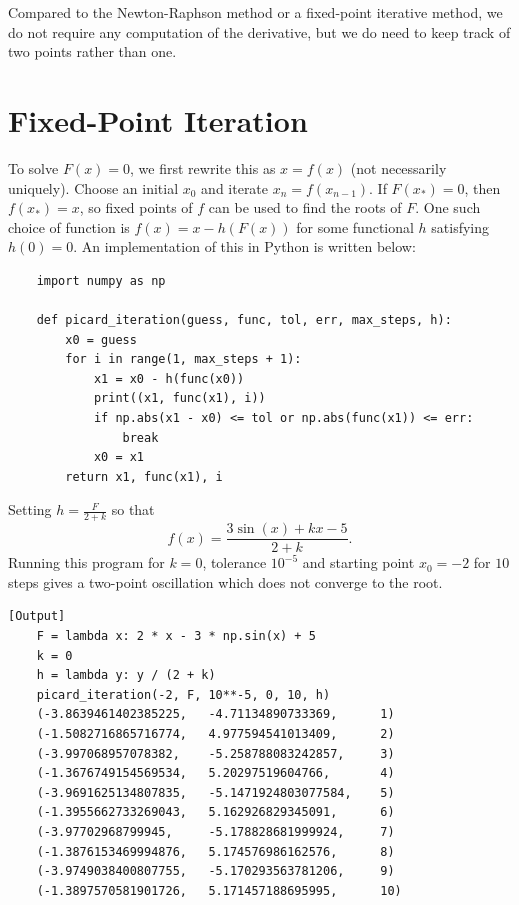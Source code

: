 \documentclass{article}
\begin{document}
Compared to the Newton-Raphson method or a fixed-point iterative method, we do not require any computation of the derivative, but we do need to keep track of two points rather than one.

\section{Fixed-Point Iteration}
To solve \(F(x) = 0\), we first rewrite this as \(x = f(x)\) (not necessarily uniquely). Choose an initial \(x_0\) and iterate \(x_n = f(x_{n-1})\). If \(F(x_*) = 0\), then \(f(x_*) = x\), so fixed points of \(f\) can be used to find the roots of \(F\). One such choice of function is \(f(x) = x - h(F(x))\) for some functional \(h\) satisfying \(h(0) = 0\). An implementation of this in Python is written below:

\begin{verbatim}
    import numpy as np
    
    def picard_iteration(guess, func, tol, err, max_steps, h):
        x0 = guess
        for i in range(1, max_steps + 1):
            x1 = x0 - h(func(x0))
            print((x1, func(x1), i))
            if np.abs(x1 - x0) <= tol or np.abs(func(x1)) <= err:
                break
            x0 = x1
        return x1, func(x1), i
\end{verbatim}

Setting \(h = \frac{F}{2 + k}\) so that 
\[f(x) = \frac{3\sin(x) + kx - 5}{2 + k}. \]
Running this program for \(k = 0\), tolerance \(10^{-5}\) and starting point \(x_0 = -2\) for \(10\) steps gives a two-point oscillation which does not converge to the root.

\begin{verbatim}[Output]
    F = lambda x: 2 * x - 3 * np.sin(x) + 5
    k = 0
    h = lambda y: y / (2 + k)
    picard_iteration(-2, F, 10**-5, 0, 10, h)
    (-3.8639461402385225,   -4.71134890733369,      1)
    (-1.5082716865716774,   4.977594541013409,      2)
    (-3.997068957078382,    -5.258788083242857,     3)
    (-1.3676749154569534,   5.20297519604766,       4)
    (-3.9691625134807835,   -5.1471924803077584,    5)
    (-1.3955662733269043,   5.162926829345091,      6)
    (-3.97702968799945,     -5.178828681999924,     7)
    (-1.3876153469994876,   5.174576986162576,      8)
    (-3.9749038400807755,   -5.170293563781206,     9)
    (-1.3897570581901726,   5.171457188695995,      10)
\end{verbatim}
\end{document}
